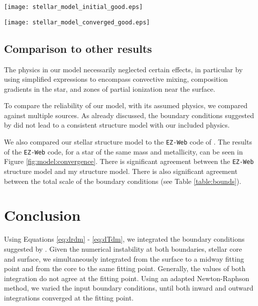 \begin{figure*}[p]
\centering
    \texttt{[image: stellar\_model\_initial\_good.eps]}
        \caption{\label{fig:model:initial} Results of numerically integrating Equations \ref{eq:drdm} - \ref{eq:dTdm} with the initial boundary conditions in Table \ref{table:bounds}, as suggested by \cite{Hansen}. Fitting point, $m_f = 0.5 M_\ast$ noted by vertical dashed line. Note the discontinuities at the fitting point.}
    \texttt{[image: stellar\_model\_converged\_good.eps]}
        \caption{\label{fig:model:convergence} Same as in Figure \ref{fig:model:initial}, but now the converged boundary conditions listed in Table \ref{table:bounds}. Fitting point, $m_f = 0.5 M_\ast$ noted by vertical dashed line. The dashed represents the results of the \texttt{EZ-Web} code \citep[see Section \ref{sec:Results:comparison} and][]{EZWeb}. The disagreement between our model and the \texttt{EZ-Web} model is virtually imperceptible.}
\end{figure*}


\subsection{Comparison to other results}
\label{sec:Results:comparison}
The physics in our model necessarily neglected certain effects, in particular by using simplified expressions to encompass convective mixing, composition gradients in the star, and zones of partial ionization near the surface.

To compare the reliability of our model, with its assumed physics, we compared against multiple sources.  As already discussed, the boundary conditions suggested by \cite{KippenhahnWeigertWeiss} did not lead to a consistent structure model with our included physics.

We also compared our stellar structure model to the \texttt{EZ-Web} code of \cite{EZWeb}.  The results of the \texttt{EZ-Web} code, for a star of the same mass and metallicity, can be seen in Figure \ref{fig:model:convergence}.  There is significant agreement between the \texttt{EZ-Web} structure model and my structure model. There is also significant agreement between the total scale of the boundary conditions (see Table \ref{table:bounds}).


\section{Conclusion}
\label{sec:conclusion}
Using Equations \ref{eq:drdm} - \ref{eq:dTdm}, we integrated the boundary conditions suggested by \cite{Hansen}.  Given the numerical instability at both boundaries, stellar core and surface, we simultaneously integrated from the surface to a midway fitting point and from the core to the same fitting point.  Generally, the values of both integration do not agree at the fitting point.  Using an adapted Newton-Raphson method, we varied the input boundary conditions, until both inward and outward integrations converged at the fitting point.

